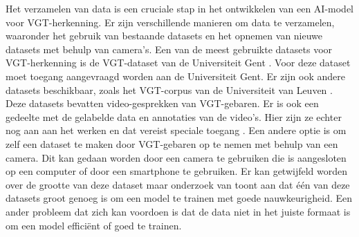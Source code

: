 Het verzamelen van data is een cruciale stap in het ontwikkelen van een AI-model voor VGT-herkenning.
Er zijn verschillende manieren om data te verzamelen, waaronder het gebruik van bestaande datasets en het opnemen van nieuwe datasets met behulp van camera's.
Een van de meest gebruikte datasets voor VGT-herkenning is de VGT-dataset van de Universiteit Gent \autocite{VGT_Signbank}.
Voor deze dataset moet toegang aangevraagd worden aan de Universiteit Gent.
Er zijn ook andere datasets beschikbaar, zoals het VGT-corpus van de Universiteit van Leuven \autocite{Corpus_VGT}.
Deze datasets bevatten video-gesprekken van VGT-gebaren.
Er is ook een gedeelte met de gelabelde data en annotaties van de video's.
Hier zijn ze echter nog aan aan het werken en dat vereist speciale toegang \autocite{Over_het_Corpus_VGT}.
Een andere optie is om zelf een dataset te maken door VGT-gebaren op te nemen met behulp van een camera.
Dit kan gedaan worden door een camera te gebruiken die is aangesloten op een computer of door een smartphone te gebruiken.
Er kan getwijfeld worden over de grootte van deze dataset maar onderzoek van \textcite{Coster2023} toont aan dat {\'e}{\'e}n van deze datasets groot genoeg is om een model te trainen met goede nauwkeurigheid.
Een ander probleem dat zich kan voordoen is dat de data niet in het juiste formaat is om een model effici{\"e}nt of goed te trainen\autocite{Vandeghinste2024}.


